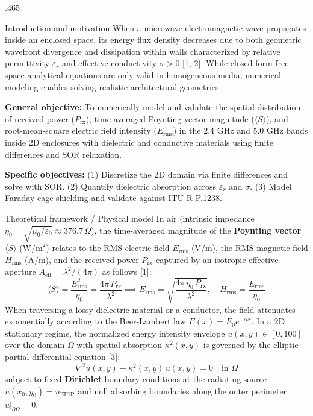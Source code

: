 \documentclass[final]{beamer}
\begin{document}
\begin{frame}[t]
\begin{columns}[t]
\begin{column}{.465\paperwidth}
				\begin{block}{Introduction and motivation}
					When a microwave electromagnetic wave propagates inside an enclosed space, its energy flux density decreases due to both geometric wavefront divergence and dissipation within walls characterized by relative permittivity \(\varepsilon_r\) and effective conductivity \(\sigma > 0\) [1, 2]. While closed-form free-space analytical equations are only valid in homogeneous media, numerical modeling enables solving realistic architectural geometries.
					
					\vspace{0.2cm}
					\textbf{General objective:} To numerically model and validate the spatial distribution of received power (\(P_{\text{rx}}\)), time-averaged Poynting vector magnitude (\(\langle S \rangle\)), and root-mean-square electric field intensity (\(E_{\text{rms}}\)) in the \(2.4\text{ GHz}\) and \(5.0\text{ GHz}\) bands inside 2D enclosures with dielectric and conductive materials using finite differences and SOR relaxation.
					
					\vspace{0.15cm}
					\textbf{Specific objectives:} (1) Discretize the 2D domain via finite differences and solve with SOR. (2) Quantify dielectric absorption across \(\varepsilon_r\) and \(\sigma\). (3) Model Faraday cage shielding and validate against ITU-R P.1238.
				\end{block}
				
				\begin{block}{Theoretical framework / Physical model}
					In air (intrinsic impedance \(\eta_0 = \sqrt{\mu_0/\varepsilon_0} \approx 376.7\,\Omega\)), the time-averaged magnitude of the \textbf{Poynting vector} \(\langle S \rangle\) (\(\text{W/m}^2\)) relates to the RMS electric field \(E_{\text{rms}}\) (\(\text{V/m}\)), the RMS magnetic field \(H_{\text{rms}}\) (\(\text{A/m}\)), and the received power \(P_{\text{rx}}\) captured by an isotropic effective aperture \(A_{\text{eff}} = \lambda^2/(4\pi)\) as follows [1]:
					\begin{equation}
						\langle S \rangle = \frac{E_{\text{rms}}^2}{\eta_0} = \frac{4\pi\,P_{\text{rx}}}{\lambda^2} \implies E_{\text{rms}} = \sqrt{\frac{4\pi\,\eta_0\,P_{\text{rx}}}{\lambda^2}}, \quad H_{\text{rms}} = \frac{E_{\text{rms}}}{\eta_0}
					\end{equation}
					When traversing a lossy dielectric material or a conductor, the field attenuates exponentially according to the Beer-Lambert law \(E(x) = E_0 e^{-\alpha x}\). In a 2D stationary regime, the normalized energy intensity envelope \(u(x,y) \in [0, 100]\) over the domain \(\Omega\) with spatial absorption \(\kappa^2(x,y)\) is governed by the elliptic partial differential equation [3]:
					\begin{equation}
						\nabla^2 u(x,y) - \kappa^2(x,y)\,u(x,y) = 0 \quad \text{in } \Omega
					\end{equation}
					subject to fixed \textbf{Dirichlet} boundary conditions at the radiating source \(u(x_0,y_0) = u_{\text{EIRP}}\) and null absorbing boundaries along the outer perimeter \(u|_{\partial\Omega} = 0\).
					

\end{block}
\end{column}
\end{columns}
\end{frame}
\end{document}
